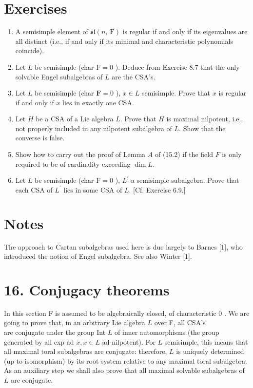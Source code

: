 \documentclass[10pt]{article}
\begin{document}
\section*{Exercises}
\begin{enumerate}
  \item A semisimple element of $\mathfrak{s l}(n, \mathrm{~F})$ is regular if and only if its eigenvalues are all distinct (i.e., if and only if its minimal and characteristic polynomials coincide).
  \item Let $L$ be semisimple (char $\mathrm{F}=0$ ). Deduce from Exercise 8.7 that the only solvable Engel subalgebras of $L$ are the CSA's.
  \item Let $L$ be semisimple (char $\mathbf{F}=0$ ), $x \in L$ semisimple. Prove that $x$ is regular if and only if $x$ lies in exactly one CSA.
  \item Let $H$ be a CSA of a Lie algebra $L$. Prove that $H$ is maximal nilpotent, i.e., not properly included in any nilpotent subalgebra of $L$. Show that the converse is false.
  \item Show how to carry out the proof of Lemma $A$ of (15.2) if the field $F$ is only required to be of cardinality exceeding $\operatorname{dim} L$.
  \item Let $L$ be semisimple (char $\mathrm{F}=0$ ), $L^{\prime}$ a semisimple subalgebra. Prove that each CSA of $L^{\prime}$ lies in some CSA of $L$. [Cf. Exercise 6.9.]
\end{enumerate}

\section*{Notes}
The approach to Cartan subalgebras used here is due largely to Barnes [1], who introduced the notion of Engel subalgebra. See also Winter [1].

\section*{16. Conjugacy theorems}
In this section F is assumed to be algebraically closed, of characteristic 0 . We are going to prove that, in an arbitrary Lie algebra $L$ over F, all CSA's\\
are conjugate under the group Int $L$ of inner automorphisms (the group generated by all exp ad $x, x \in L$ ad-nilpotent). For $L$ semisimple, this means that all maximal toral subalgebras are conjugate: therefore, $L$ is uniquely determined (up to isomorphism) by its root system relative to any maximal toral subalgebra. As an auxiliary step we shall also prove that all maximal solvable subalgebras of $L$ are conjugate.
\end{document}
